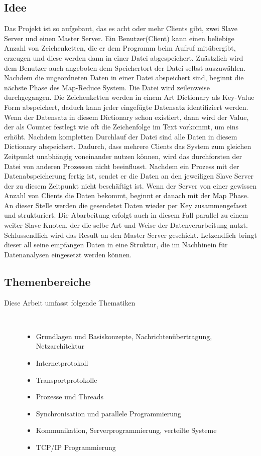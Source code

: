 \documentclass[a4paper,12pt]{article}
\begin{document}
\subsection{Idee}
Das Projekt ist so aufgebaut, das es acht oder mehr Clients gibt, zwei Slave Server und einen Master Server. Ein Benutzer(Client) kann einen beliebige Anzahl von Zeichenketten, die er dem Programm beim Aufruf mitübergibt, erzeugen und diese werden dann in einer Datei abgespeichert. Zuästzlich wird dem Benutzer auch angeboten dem Speichertort der Datei selbst auszuwählen. Nachdem die ungeordneten Daten in einer Datei 
abspeichert sind, beginnt die nächste Phase des Map-Reduce System. Die Datei wird zeilenweise durchgegangen. Die Zeichenketten werden in einem Art Dictionary als Key-Value Form abspeichert, daduch kann jeder eingefügte Datensatz identifiziert werden. Wenn der Datensatz in diesem Dictionary schon existiert, dann wird der Value, der als Counter festlegt wie oft die Zeichenfolge im Text vorkommt, um eins erhöht. Nachdem kompletten Durchlauf der Datei sind alle Daten
in diesem Dictionary abspeichert. Dadurch, dass mehrere Clients das System zum gleichen Zeitpunkt unabhängig voneinander nutzen können, wird das durchforsten der Datei von anderen Prozessen nicht beeinflusst. Nachdem ein Prozess mit der Datenabspeicherung fertig ist, sendet er die Daten an den jeweiligen Slave Server der zu diesem Zeitpunkt nicht beschäftigt ist. Wenn der Server von einer gewissen Anzahl von Clients die Daten bekommt, beginnt er danach mit der Map Phase. An dieser Stelle werden
die gesendetet Daten wieder per Key zusammengefasst und strukturiert. Die Abarbeitung erfolgt auch in diesem Fall parallel zu einem weiter Slave Knoten, der die selbe Art und Weise der Datenverarbeitung nutzt. Schlussendlich wird das Result an den Master Server geschickt. Letzendlich bringt dieser all seine empfangen Daten in eine Struktur, die im Nachhinein für Datenanalysen eingesetzt werden können.
\subsection{Themenbereiche}
\begin{description}
    \item[Diese Arbeit umfasst folgende Thematiken] ~\par
    \begin{itemize}
        \item Grundlagen und Basiskonzepte, Nachrichtenübertragung, Netzarchitektur
        \item Internetprotokoll
        \item Transportprotokolle
        \item Prozesse und Threads
        \item Synchronisation und parallele Programmierung
        \item Kommunikation, Serverprogrammierung, verteilte Systeme
        \item TCP/IP Programmierung      
    \end{itemize} 
\end{description}
\newpage
\end{document}
